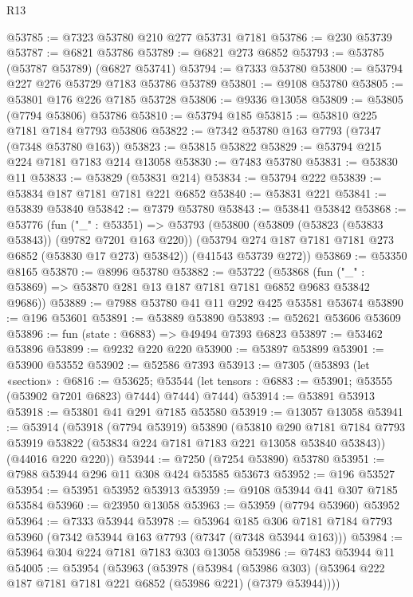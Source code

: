 \begin{lexlean}{R13}
\begin{coremodule}
@53785 := @7323 @53780 @210 @277 @53731 @7181
@53786 := @230 @53739
@53787 := @6821 @53786
@53789 := @6821 @273 @6852
@53793 := @53785 (@53787 @53789) (@6827 @53741)
@53794 := @7333 @53780
@53800 := @53794 @227 @276 @53729 @7183 @53786 @53789
@53801 := @9108 @53780
@53805 := @53801 @176 @226 @7185 @53728
@53806 := @9336 @13058
@53809 := @53805 (@7794 @53806) @53786
@53810 := @53794 @185
@53815 := @53810 @225 @7181 @7184 @7793 @53806
@53822 := @7342 @53780 @163 @7793 (@7347 (@7348 @53780 @163))
@53823 := @53815 @53822
@53829 := @53794 @215 @224 @7181 @7183 @214 @13058
@53830 := @7483 @53780
@53831 := @53830 @11
@53833 := @53829 (@53831 @214)
@53834 := @53794 @222
@53839 := @53834 @187 @7181 @7181 @221 @6852
@53840 := @53831 @221
@53841 := @53839 @53840
@53842 := @7379 @53780
@53843 := @53841 @53842
@53868 := @53776
    (fun ("_" : @53351) =>
    @53793
      (@53800
        (@53809 (@53823 (@53833 @53843)) (@9782 @7201 @163 @220))
        (@53794 @274 @187 @7181 @7181 @273 @6852 (@53830 @17 @273) @53842))
      (@41543 @53739 @272))
@53869 := @53350 @8165
@53870 := @8996 @53780
@53882 := @53722
    (@53868 (fun ("_" : @53869) => @53870 @281 @13 @187 @7181 @7181 @6852 @9683 @53842 @9686))
@53889 := @7988 @53780 @41 @11 @292 @425 @53581 @53674
@53890 := @196 @53601
@53891 := @53889 @53890
@53893 := @52621 @53606 @53609
@53896 := fun (state : @6883) => @49494 @7393 @6823
@53897 := @53462 @53896
@53899 := @9232 @220 @220
@53900 := @53897 @53899
@53901 := @53900 @53552
@53902 := @52586 @7393
@53913 := @7305
    (@53893
      (let «section» : @6816 := @53625;
      @53544 (let tensors : @6883 := @53901; @53555 (@53902 @7201 @6823) @7444) @7444)
      @7444)
@53914 := @53891 @53913
@53918 := @53801 @41 @291 @7185 @53580
@53919 := @13057 @13058
@53941 := @53914
    (@53918
      (@7794 @53919)
      @53890
      (@53810
        @290
        @7181
        @7184
        @7793
        @53919
        @53822
        (@53834 @224 @7181 @7183 @221 @13058 @53840 @53843))
      (@44016 @220 @220))
@53944 := @7250 (@7254 @53890) @53780
@53951 := @7988 @53944 @296 @11 @308 @424 @53585 @53673
@53952 := @196 @53527
@53954 := @53951 @53952 @53913
@53959 := @9108 @53944 @41 @307 @7185 @53584
@53960 := @23950 @13058
@53963 := @53959 (@7794 @53960) @53952
@53964 := @7333 @53944
@53978 := @53964
    @185
    @306
    @7181
    @7184
    @7793
    @53960
    (@7342 @53944 @163 @7793 (@7347 (@7348 @53944 @163)))
@53984 := @53964 @304 @224 @7181 @7183 @303 @13058
@53986 := @7483 @53944 @11
@54005 := @53954
    (@53963
      (@53978
        (@53984
          (@53986 @303)
          (@53964 @222 @187 @7181 @7181 @221 @6852 (@53986 @221) (@7379 @53944))))

\end{coremodule}
\end{lexlean}
